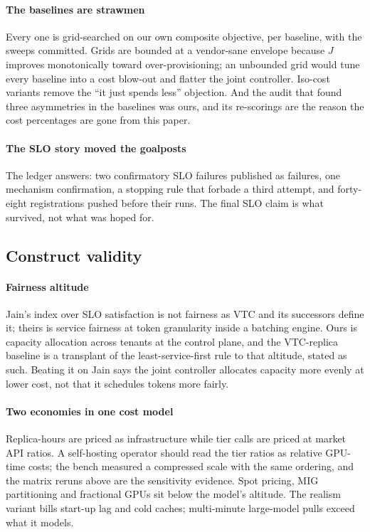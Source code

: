 \paragraph{The baselines are strawmen} Every one is grid-searched on our
own composite objective, per baseline, with the sweeps committed. Grids
are bounded at a vendor-sane envelope because $J$ improves monotonically
toward over-provisioning; an unbounded grid would tune every baseline into
a cost blow-out and flatter the joint controller. Iso-cost variants remove
the ``it just spends less'' objection. And the audit that found three
asymmetries in the baselines was ours, and its re-scorings are the reason
the cost percentages are gone from this paper.

\paragraph{The SLO story moved the goalposts} The ledger answers: two
confirmatory SLO failures published as failures, one mechanism
confirmation, a stopping rule that forbade a third attempt, and forty-eight
registrations pushed before their runs. The final SLO claim is what
survived, not what was hoped for.

\subsection{Construct validity}

\paragraph{Fairness altitude} Jain's index over SLO satisfaction is not
fairness as VTC and its successors define it; theirs is service fairness
at token granularity inside a batching engine. Ours is capacity allocation
across tenants at the control plane, and the VTC-replica baseline is a
transplant of the least-service-first rule to that altitude, stated as
such. Beating it on Jain says the joint controller allocates capacity more
evenly at lower cost, not that it schedules tokens more fairly.

\paragraph{Two economies in one cost model} Replica-hours are priced as
infrastructure while tier calls are priced at market API ratios. A
self-hosting operator should read the tier ratios as relative GPU-time
costs; the bench measured a compressed scale with the same ordering, and
the matrix reruns above are the sensitivity evidence. Spot pricing, MIG
partitioning and fractional GPUs sit below the model's altitude. The
realism variant bills start-up lag and cold caches; multi-minute
large-model pulls exceed what it models.

